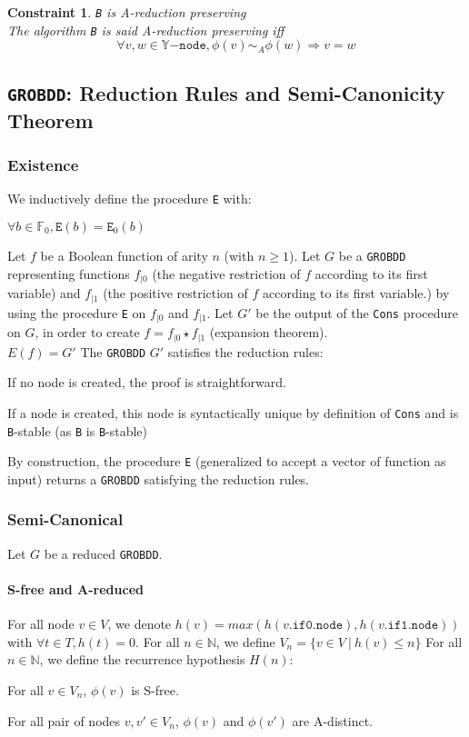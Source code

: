 \documentclass[a4paper,10pt]{article}
\newcommand{\N}{\mathbb{N}}%
\newcommand{\F}{\mathbb{F}}
\newcommand{\Y}{\mathbb{Y}}
\newcommand{\Ynode}{\Y\mathtt{-node}}
\newcommand{\GroBdd}{\texttt{GROBDD}}
\newcommand{\fieldNode}{\texttt{node}}
\newcommand{\fieldThen}{\mathtt{if1}}
\newcommand{\fieldElse}{\mathtt{if0}}
\newcommand\restr[2]{{#1}_{\left|{#2}\right.}}
\newtheorem{newcons}{Constraint}
\newcommand{\constraint}[2]{\begin{newcons}{#1\\}#2\end{newcons}}
\begin{document}
\constraint{\texttt{B} is A-reduction preserving}
{The algorithm \texttt{B} is said A-reduction preserving iff
\[\forall v, w \in\Ynode, \phi(v) \sim_A \phi(w) \Rightarrow v = w\]}

\subsection{\GroBdd{}: Reduction Rules and Semi-Canonicity Theorem\label{grobdd-reduction}}

\subsubsection{Existence}
We inductively define the procedure \texttt{E} with: \begin{compactitem}
\item $\forall b\in\F_0, \texttt{E}(b) = \texttt{E}_0(b)$
\item
Let $f$ be a Boolean function of arity $n$ (with $n \geq 1$).
Let $G$ be a \GroBdd{} representing functions $\restr{f}{0}$ (the negative restriction of $f$ according to its first variable) and $\restr{f}{1}$ (the positive restriction of $f$ according to its first variable.) by using the procedure \texttt{E} on $\restr{f}{0}$ and $\restr{f}{1}$.
Let $G'$ be the output of the \texttt{Cons} procedure on $G$, in order to create $f = \restr{f}{0} \star \restr{f}{1}$ (expansion theorem).\\
$E(f) = G'$
The \GroBdd{} $G'$ satisfies the reduction rules: \begin{compactitem}
\item If no node is created, the proof is straightforward.
\item If a node is created, this node is syntactically unique by definition of \texttt{Cons} and is \texttt{B}-stable (as \texttt{B} is \texttt{B}-stable)
\end{compactitem}
\end{compactitem}

By construction, the procedure \texttt{E} (generalized to accept a vector of function as input) returns a \GroBdd{} satisfying the reduction rules.

\subsubsection{Semi-Canonical}

Let $G$ be a reduced \GroBdd{}.

\paragraph{S-free and A-reduced}
For all node $v\in V$, we denote $h(v) = max(h(v.\fieldElse{}.\fieldNode{}), h(v.\fieldThen{}.\fieldNode{}))$ with $\forall t\in T, h(t) = 0$.
For all $n\in\N$, we define $V_n = \{v\in V ~|~ h(v) \leq n\}$
For all $n\in\N$, we define the recurrence hypothesis $H(n)$: \begin{compactitem}
\item For all $v\in V_n$, $\phi(v)$ is S-free.
\item For all pair of nodes $v, v'\in V_n$, $\phi(v)$ and $\phi(v')$ are A-distinct.
\end{compactitem}
\end{document}
